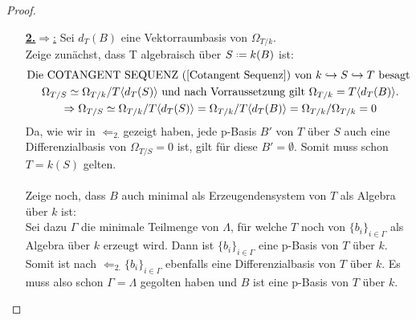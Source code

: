 \documentclass[10pt,a4paper]{report}
\newcommand{\comment}[1]{}
\newcommand{\divR}[2]{\Omega_{#1/#2}}
\newcommand{\divf}[1]{d_{#1}}
\newcommand*{\defeq}{\mathrel{\vcenter{\baselineskip0.5ex \lineskiplimit0pt
                     \hbox{\scriptsize.}\hbox{\scriptsize.}}}%
                     =}
\newcommand{\Verz}[1]{\langle #1 \rangle}
\begin{document}
\begin{proof}
\begin{itemize}
\item[\underline{\textbf{2.}\glqq$\Rightarrow$\grqq:}] Sei $\divf{T}(B)$ eine Vektorraumbasis von $\divR{T}{k}$.\\
Zeige zunächst, dass T algebraisch über $S \defeq k(B)$ ist:
\begin{gather*}
\text{Die COTANGENT SEQUENZ (\cref{Cotangent Sequenz}) von $k \hookrightarrow S \hookrightarrow T$ besagt }\\
\divR{T}{S} \simeq \divR{T}{k}/T \Verz{\divf{T}(S)} \text{ und nach Vorraussetzung gilt } \divR{T}{k} = T \langle \divf{T}(B) \rangle. \\
\Rightarrow \divR{T}{S} \simeq \divR{T}{k}/T\Verz{\divf{T}(S)} = \divR{T}{k}/T\Verz{\divf{T}(B)}=
\divR{T}{k}/\divR{T}{k} = 0
\end{gather*}
Da, wie wir in \glqq$\Leftarrow_{2.}$\grqq gezeigt haben, jede p-Basis $B'$ von $T$ über $S$ auch eine Differenzialbasis von $\divR{T}{S} = 0$ ist, gilt für diese $B' = \emptyset$. Somit  muss schon $T = k(S)$ gelten.\\
\ \\
Zeige noch, dass $B$ auch minimal als Erzeugendensystem von $T$ als Algebra über $k$ ist:\\
Sei dazu $\Gamma$ die minimale Teilmenge von $\Lambda$, für welche $T$ noch von $\lbrace b_i \rbrace_{i \in \Gamma}$ als Algebra über $k$ erzeugt wird. Dann ist $\lbrace b_i \rbrace_{i \in \Gamma}$ eine p-Basis von $T$ über $k$. Somit ist nach \glqq$\Leftarrow_{2.}$\grqq $\lbrace b_i \rbrace_{i \in \Gamma}$ ebenfalls eine Differenzialbasis von $T$ über $k$. Es muss also schon $\Gamma = \Lambda$ gegolten haben und $B$ ist eine p-Basis von $T$ über $k$. \comment{\label{*p-Basis ist minnimaler Erzeuger von T als Algebra}}
\end{itemize}
\end{proof}
\end{document}

